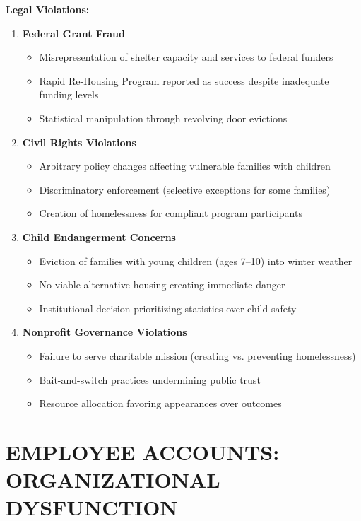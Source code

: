 \documentclass[11pt,letterpaper]{article}
\begin{document}
\textbf{Legal Violations:}

\begin{enumerate}[leftmargin=*]
\item \textbf{Federal Grant Fraud}
\begin{itemize}
\item Misrepresentation of shelter capacity and services to federal funders
\item Rapid Re-Housing Program reported as success despite inadequate funding levels
\item Statistical manipulation through revolving door evictions
\end{itemize}

\item \textbf{Civil Rights Violations}
\begin{itemize}
\item Arbitrary policy changes affecting vulnerable families with children
\item Discriminatory enforcement (selective exceptions for some families)
\item Creation of homelessness for compliant program participants
\end{itemize}

\item \textbf{Child Endangerment Concerns}
\begin{itemize}
\item Eviction of families with young children (ages 7--10) into winter weather
\item No viable alternative housing creating immediate danger
\item Institutional decision prioritizing statistics over child safety
\end{itemize}

\item \textbf{Nonprofit Governance Violations}
\begin{itemize}
\item Failure to serve charitable mission (creating vs. preventing homelessness)
\item Bait-and-switch practices undermining public trust
\item Resource allocation favoring appearances over outcomes
\end{itemize}
\end{enumerate}

\newpage

\section{EMPLOYEE ACCOUNTS: ORGANIZATIONAL DYSFUNCTION}
\end{document}
